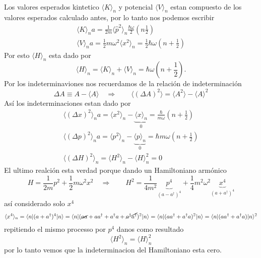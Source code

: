 \begin{enumerate}
\begin{align*}
\end{align*}
Los valores esperados kintetico $\langle K \rangle_n$ y potencial $\langle V
\rangle_n$ estan compuesto de los valores esperados calculado antes, por lo
tanto nos podemos escribir
\begin{align*}
	\langle K \rangle_n a= \frac{1}{2m} \langle \hat p^2 \rangle_n \frac{\hbar
\omega}{2} \left( n \frac{1}{2} \right) \\
	\langle V \rangle_n a=  \frac{1}{2} m \omega^2 \langle x^2 \rangle_n =
\frac{1}{2} \hbar \omega \left( n + \frac{1}{2} \right)
\end{align*}
Por esto $\langle H \rangle_n$  esta dado por
\begin{equation*}
	\langle H \rangle_n = \langle K \rangle_n + \langle V \rangle_n = \hbar
\omega \left( n + \frac{1}{2} \right).
\end{equation*}
Por los indeterminaviones nos recuerdamos de la relación de indeterminación
\begin{equation*}
	\Delta A \equiv A - \langle A \rangle \quad \Rightarrow \qquad \langle
(\Delta A)^2 \rangle = \langle A^2 \rangle - \langle A \rangle^2
\end{equation*}
Así los indeterminaciones estan dado por
\begin{align*}
	\langle (\Delta x)^2 \rangle_n a= \langle x^2 \rangle_n -
\underbrace{\langle x \rangle_n}_0 = \frac{\hbar}{m\omega} \left( n +
\frac{1}{2}\right) \\
	\langle (\Delta p)^2 \rangle_n a= \langle p^2 \rangle_n -
\underbrace{\langle p \rangle_n}_0 = \hbar m \omega \left(n + \frac{1}{2}
\right) \\
	\langle (\Delta H)^2 \rangle_n = \langle H^2 \rangle_n - \langle H
\rangle_n^2 = 0
\end{align*}
El ultimo realción esta verdad porque dando un Hamiltoniano armónico
\begin{equation*}
	H = \frac{1}{2m} p^2 + \frac{1}{2} m \omega^2 x^2 \quad \Rightarrow \qquad
H^2 = \frac{1}{4m^2} \underbrace{p^4}_{(a-a^\dagger)^4} + \frac{1}{4} m^2
\omega^2 \underbrace{x^4}_{(a+a^\dagger)^4}
\end{equation*}
así considerado solo $x^4$
\begin{equation*}
	\langle x^4 \rangle_n = \langle n |(a+a^\dagger)^4 | n \rangle = \langle n |(\cancel{aa} + aa^\dagger + a^\dagger a + \cancel{a^\dagger
a^\dagger})^2 | n \rangle = \langle n |(aa^\dagger + a^\dagger a)^2 | n \rangle
= \langle n | ( a a^\dagger + a^\dagger a) | n \rangle^2  
\end{equation*}
repitiendo el mismo processo por $p^4$ danos como resultado
\begin{equation*}
	\langle H^2 \rangle_n = \langle H \rangle_n^2
\end{equation*}
por lo tanto vemos que la indeterminacion del Hamiltoniano esta cero.


\end{enumerate}
